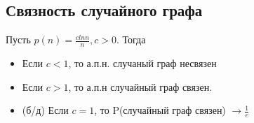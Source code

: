 \subsection{Связность случайного графа}

\begin{theorem}
    Пусть $p(n) = \frac{clnn}{n}, c > 0.$ Тогда 
    \begin{itemize}
        \item Если $c < 1$, то а.п.н. случаный граф несвязен
        \item Если $c > 1$, то а.п.н случайный граф связен.
        \item (б/д) Если $c = 1$, то P(случайный граф связен) $\to \frac{1}{e}$
    \end{itemize}
    
\end{theorem}

